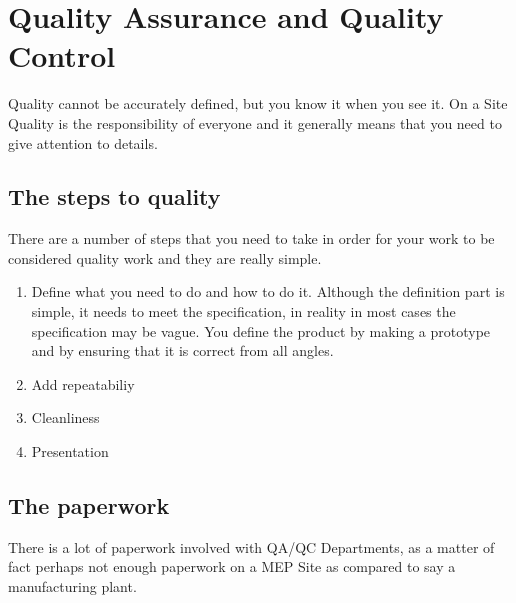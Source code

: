 \chapter{Quality Assurance and Quality Control}

Quality cannot be accurately defined, but you know it when you see it. On a Site
Quality is the responsibility of everyone and it generally means that you need to
give attention to details.

\section*{The steps to quality}

There are a number of steps that you need to take in order for your work to
be considered quality work and they are really simple.

\begin{enumerate}
\item  Define what you need to do and how to do it. Although the definition part
is simple, it needs to meet the specification, in reality in most cases the specification may be vague. You define the product by making a prototype and by ensuring that it is correct from all angles.

\item Add repeatabiliy

\item Cleanliness

\item Presentation

\end{enumerate}

\section*{The paperwork}

There is a lot of paperwork involved with QA/QC Departments, as a matter of fact perhaps not enough paperwork on a MEP Site as compared to say a manufacturing plant.